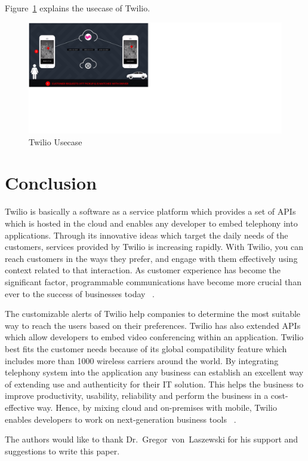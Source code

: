 Figure~\ref{f:usecase} explains the usecase of Twilio.


\begin{figure}[!ht]
  \centering\includegraphics[width=\columnwidth]{image/Twilio-Usecase.PNG}
  \caption{Twilio Usecase~\cite{hid-sp18-406-twilio-usecase-image}}
\label{f:usecase}
\end{figure}



\section{Conclusion}
Twilio is basically a software as a service platform which provides a set of 
APIs which is hosted in the cloud and enables any developer to embed telephony 
into applications. Through its innovative ideas which target the daily needs of 
the customers, services provided by Twilio is increasing rapidly. With Twilio, 
you can reach customers in the ways they prefer, and engage with them 
effectively using context related to that interaction. As customer experience 
has become the significant factor, programmable communications have become more 
crucial than ever to the success of businesses today
~\cite{hid-sp18-406-twilio-conclusion1}. 
 
The customizable alerts of Twilio help companies to determine the most suitable 
way to reach the users based on their preferences. Twilio has also extended APIs 
which allow developers to embed video conferencing within an application. Twilio
best fits the customer needs because of its global compatibility feature which 
includes more than 1000 wireless carriers around the world. By integrating  
telephony system into the application any business can establish an excellent 
way of extending use and authenticity for their IT solution. This helps the 
business to improve productivity, usability, reliability and perform the 
business in a cost-effective way. Hence, by mixing cloud and on-premises with 
mobile, Twilio enables developers to work on next-generation business tools
~\cite{hid-sp18-406-twilio-conclusion2}.

\begin{acks}

  The authors would like to thank Dr.~Gregor~von~Laszewski for his
  support and suggestions to write this paper.

\end{acks}


 


